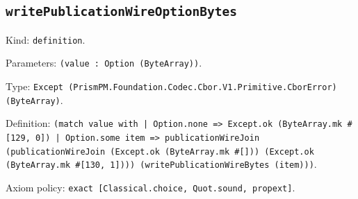 \documentclass[11pt]{article}
\begin{document}
\subsection*{\texttt{writePublicationWireOptionBytes}}
\noindent Kind: \texttt{definition}.\par
\noindent Parameters: \texttt{(value : Option (ByteArray))}.\par
\noindent Type: \texttt{Except (PrismPM.Foundation.Codec.Cbor.V1.Primitive.CborError) (ByteArray)}.\par
\noindent Definition: \texttt{(match value with | Option.none => Except.ok (ByteArray.mk \#[129, 0]) | Option.some item => publicationWireJoin (publicationWireJoin (Except.ok (ByteArray.mk \#[])) (Except.ok (ByteArray.mk \#[130, 1]))) (writePublicationWireBytes (item)))}.\par
\noindent Axiom policy: \texttt{exact [Classical.choice, Quot.sound, propext]}.\par
\end{document}
